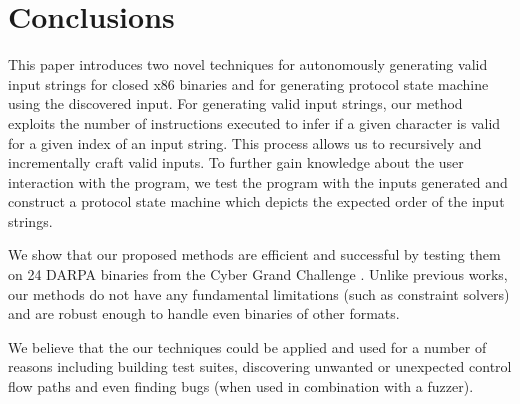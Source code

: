 \documentclass{acm_proc_article-sp}
\def \numbinaries {24}
\begin{document}
\section{Conclusions}
This paper introduces two novel techniques for autonomously generating valid input strings for closed x86 binaries and for generating protocol state machine using the discovered input.
For generating valid input strings, our method exploits the number of instructions executed to infer if a given character is valid for a given index of an input string.
This process allows us to recursively and incrementally craft valid inputs.
To further gain knowledge about the user interaction with the program, we test the program with the inputs generated and construct a protocol state machine which depicts the expected order of the input strings.

We show that our proposed methods are efficient and successful by testing them on \numbinaries{} DARPA binaries from the Cyber Grand Challenge \cite{darpacgc}. 
Unlike previous works, our methods do not have any fundamental limitations (such as constraint solvers) and are robust enough to handle even binaries of other formats.

We believe that the our techniques could be applied and used for a number of reasons including building test suites, discovering unwanted or unexpected control flow paths and even finding bugs (when used in combination with a fuzzer).




\end{document}
